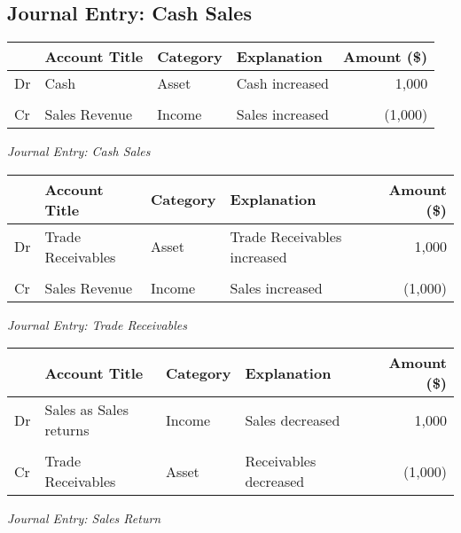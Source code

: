 

\subsection*{Journal Entry: Cash Sales}

\vspace{1em}

\begin{center} 
\begin{tabular}{@{} l l l l r @{}}
\toprule
& \textbf{Account Title} & \textbf{Category} & \textbf{Explanation} & \textbf{Amount (\$)} \\
\midrule
Dr & Cash & Asset & Cash increased & \hfill 1,000 \\
 & \quad  & \\
Cr & Sales Revenue & Income & Sales increased& \hfill (1,000) \\
\bottomrule
\end{tabular}
\end{center}
\vspace{1em}
\textit{Journal Entry: Cash Sales}

\vspace{1em}

\begin{center} 
\begin{tabular}{@{} l l l l r @{}}
\toprule
& \textbf{Account Title} & \textbf{Category} & \textbf{Explanation} & \textbf{Amount (\$)} \\
\midrule
Dr & Trade Receivables & Asset & Trade Receivables increased & 1,000 \\
 & \quad  & \\
Cr & Sales Revenue & Income & Sales increased& (1,000) \\
\bottomrule
\end{tabular}
\end{center}
\vspace{1em}
\textit{Journal Entry: Trade Receivables}

\begin{center} 
\begin{tabular}{@{} l l l l r @{}}
\toprule
& \textbf{Account Title} & \textbf{Category} & \textbf{Explanation} & \textbf{Amount (\$)} \\
\midrule
Dr & Sales as Sales returns & Income & Sales decreased & 1,000 \\
 & \quad  & \\
Cr & Trade Receivables & Asset & Receivables decreased & (1,000) \\
\bottomrule
\end{tabular}
\end{center}
\vspace{1em}
\textit{Journal Entry: Sales Return}

